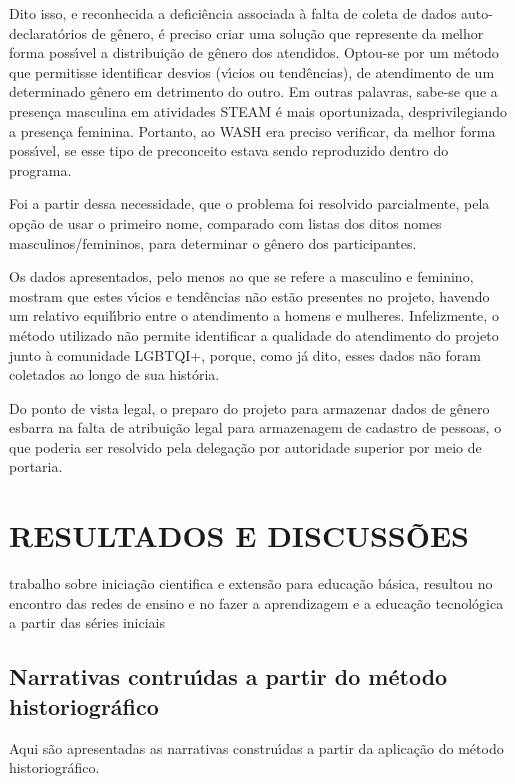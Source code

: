 \documentclass[
12pt,		%
openright,	%
twoside,  %
a4paper,			%
chapter=TITLE,		%
english,			%
french,				%
spanish,			%
brazil				%
]{USPSC-classe/USPSC}
\begin{document}
Dito isso, e reconhecida a defici\^encia associada \`a falta de coleta de dados auto-declarat\'orios de g\^enero, \'e preciso criar uma solu\c{c}\~ao que represente da melhor forma poss\'{\i}vel a distribui\c{c}\~ao de g\^enero dos atendidos. Optou-se por um m\'etodo que permitisse identificar desvios (v\'{\i}cios ou tend\^encias), de atendimento de um determinado g\^enero em detrimento do outro. Em outras palavras, sabe-se que a presen\c{c}a masculina em atividades STEAM \'e mais oportunizada, desprivilegiando a presen\c{c}a feminina. Portanto, ao WASH era preciso verificar, da melhor forma poss\'{\i}vel, se esse tipo de preconceito estava sendo reproduzido dentro do programa.


Foi a partir dessa necessidade, que o problema foi resolvido parcialmente, pela op\c{c}\~ao de usar o primeiro nome, comparado com listas dos ditos nomes masculinos/femininos, para determinar o g\^enero dos participantes.


Os dados apresentados, pelo menos ao que se refere a masculino e feminino, mostram que estes v\'{\i}cios e tend\^encias n\~ao est\~ao presentes no projeto, havendo um relativo equil\'{\i}brio entre o atendimento a homens e mulheres. Infelizmente, o m\'etodo utilizado n\~ao permite identificar a qualidade do atendimento do projeto junto \`a comunidade LGBTQI+, porque, como j\'a dito, esses dados n\~ao foram coletados ao longo de sua hist\'oria.


Do ponto de vista legal, o preparo do projeto para armazenar dados de g\^enero esbarra na falta de atribui\c{c}\~ao legal para armazenagem de cadastro de pessoas, o que poderia ser resolvido pela delega\c{c}\~ao por autoridade superior por meio de portaria.


\chapter[RESULTADOS E DISCUSS\~OES]{RESULTADOS E DISCUSS\~OES}\label{RESULTADOS E DISCUSS\~OES}
trabalho sobre inicia\c{c}\~ao  cientifica e extens\~ao para educa\c{c}\~ao b\'asica, resultou no encontro das redes de ensino  e no fazer a aprendizagem e  a educa\c{c}\~ao tecnol\'ogica   a partir das s\'eries iniciais


\section[Narrativas contru\'{\i}das a partir do m\'etodo historiogr\'afico]{Narrativas contru\'{\i}das a partir do m\'etodo historiogr\'afico}\label{Narrativas contru\'{\i}das a partir do m\'etodo historiogr\'afico}
Aqui s\~ao apresentadas as narrativas constru\'{\i}das a partir da aplica\c{c}\~ao do m\'etodo historiogr\'afico.
\end{document}
